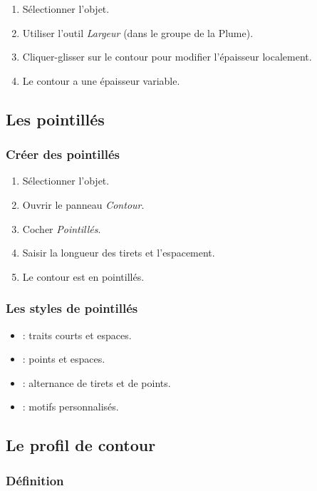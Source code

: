 \begin{enumerate}
    \item Sélectionner l'objet.
    \item Utiliser l'outil \emph{Largeur} (dans le groupe de la Plume).
    \item Cliquer-glisser sur le contour pour modifier l'épaisseur localement.
    \item Le contour a une épaisseur variable.
\end{enumerate}

\subsection{Les pointillés}

\subsubsection{Créer des pointillés}

\begin{enumerate}
    \item Sélectionner l'objet.
    \item Ouvrir le panneau \emph{Contour}.
    \item Cocher \emph{Pointillés}.
    \item Saisir la longueur des tirets et l'espacement.
    \item Le contour est en pointillés.
\end{enumerate}

\subsubsection{Les styles de pointillés}

\begin{itemize}
    \item {} : traits courts et espaces.
    \item {} : points et espaces.
    \item {} : alternance de tirets et de points.
    \item {} : motifs personnalisés.
\end{itemize}

\subsection{Le profil de contour}

\subsubsection{Définition}

